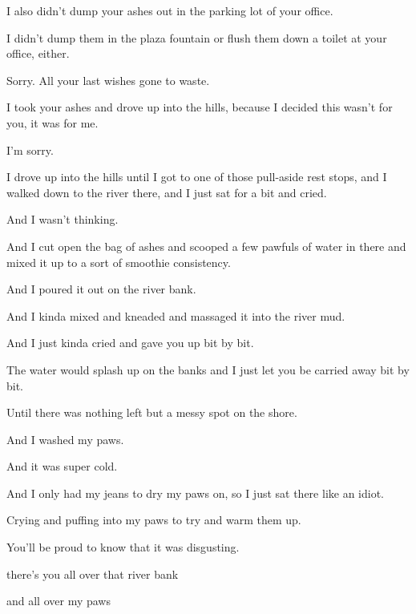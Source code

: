 {
I also didn't dump your ashes out in
the parking lot of your office.

I didn't dump them in the plaza
fountain or flush them down a toilet at your office, either.

Sorry. All your last wishes gone to
waste.

I took your ashes and drove up into
the hills, because I decided this wasn't for you, it was for me.

I'm sorry.

I drove up into the hills until I
got to one of those pull-aside rest stops, and I walked down to the
river there, and I just sat for a bit and cried.

And I wasn't thinking.

And I cut open the bag of ashes and
scooped a few pawfuls of water in there and mixed it up to a sort of
smoothie consistency.

And I poured it out on the river
bank.

And I kinda mixed and kneaded and
massaged it into the river mud.

And I just kinda cried and gave you
up bit by bit.

The water would splash up on the
banks and I just let you be carried away bit by bit.

Until there was nothing left but a
messy spot on the shore.

And I washed my paws.

And it was super cold.

And I only had my jeans to dry my
paws on, so I just sat there like an idiot.

Crying and puffing into my paws to
try and warm them up.

You'll be proud to know that it was
disgusting.

there's you all over that river bank

and all over my paws

}
